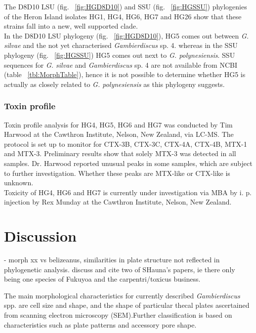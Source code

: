 \documentclass[12pt]{article}
\begin{document}
The D8D10 LSU (fig. ~\ref{fig:HGD8D10}) and SSU (fig. ~\ref{fig:HGSSU}) phylogenies of the Heron Island isolates HG1, HG4, HG6, HG7 and HG26 show that these strains fall into a new, well supported clade.\\
In the D8D10 LSU phylogeny (fig. ~\ref{fig:HGD8D10}), HG5 comes out between \emph{G. silvae} and the not yet characterised \emph{Gambierdiscus} sp. 4. whereas in the SSU phylogeny (fig. ~\ref{fig:HGSSU}) HG5 comes out next to \emph{G. polynesiensis}. SSU sequences for \emph{G. silvae} and \emph{Gambierdiscus} sp. 4 are not available from NCBI (table ~\ref{tbl:MorphTable}), hence it is not possible to determine whether HG5 is actually as closely related to \emph{G. polynesiensis} as this phylogeny suggests.\\

\subsubsection{Toxin profile}
Toxin profile analysis for HG4, HG5, HG6 and HG7 was conducted by Tim Harwood at the Cawthron Institute, Nelson, New Zealand, via LC-MS. The protocol is set up to monitor for CTX-3B, CTX-3C, CTX-4A, CTX-4B, MTX-1 and MTX-3. Preliminary results show that solely MTX-3 was detected in all samples. Dr. Harwood reported unusual peaks in some samples, which are subject to further investigation. Whether these peaks are MTX-like or CTX-like is unknown.\\
Toxicity of HG4, HG6 and HG7 is currently under investigation via MBA by i. p. injection by Rex Munday at the Cawthron Institute, Nelson, New Zealand.\\

\section{Discussion}
- morph xx vs belizeanus, similarities in plate structure not reflected in phylogenetic analysis. discuss and cite two of SHauna's papers, ie there only being one species of Fukuyoa and the carpentri/toxicus business.

The main morphological characteristics for currently described \emph{Gambierdiscus} spp. are cell size and shape, and the shape of particular thecal plates ascertained from scanning electron microscopy (SEM).Further classification is based on characteristics such as plate patterns and accessory pore shape. %
\end{document}
